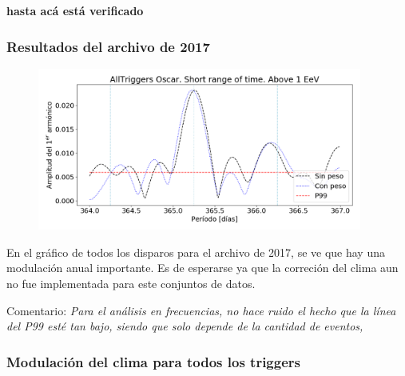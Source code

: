 {\bf hasta acá está verificado}
      \subsubsection{Resultados del archivo de 2017}

        \begin{figure}[H]
          \centering
          \includegraphics[width=0.95\textwidth]{../0_Introduccion/AllTriggers/AllTriggers_2017_Short_range_Above_1_EeV.png}
        \end{figure}
      En el gráfico de todos los disparos para el archivo de 2017, se ve que hay una modulación anual importante. Es de esperarse ya que la correción del clima aun no fue implementada para este conjuntos de datos.

      Comentario: {\sl Para el análisis en frecuencias, no hace ruido el hecho que la línea del P99 esté tan bajo, siendo que solo depende de la cantidad de eventos, }





      \subsubsection{Modulación del clima para todos los triggers}




